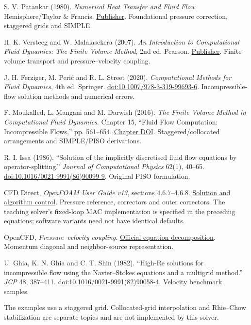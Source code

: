 \documentclass[11pt]{article}
\begin{document}
\begin{enumerate}[label={[\arabic*]}]
\item S. V. Patankar (1980). \emph{Numerical Heat Transfer and Fluid Flow}. Hemisphere/Taylor \& Francis. \href{https://www.routledge.com/Numerical-Heat-Transfer-and-Fluid-Flow/Patankar/p/book/9780891165224}{Publisher}. Foundational pressure correction, staggered grids and SIMPLE.
\item H. K. Versteeg and W. Malalasekera (2007). \emph{An Introduction to Computational Fluid Dynamics: The Finite Volume Method}, 2nd ed. Pearson. \href{https://www.pearson.com/en-gb/subject-catalog/p/Versteeg-An-Introduction-to-Computational-Fluid-Dynamics-The-Finite-Volume-Method-2nd-Edition/P200000005670?view=educator}{Publisher}. Finite-volume transport and pressure--velocity coupling.
\item J. H. Ferziger, M. Peri\'c and R. L. Street (2020). \emph{Computational Methods for Fluid Dynamics}, 4th ed. Springer. \href{https://doi.org/10.1007/978-3-319-99693-6}{doi:10.1007/978-3-319-99693-6}. Incompressible-flow solution methods and numerical errors.
\item F. Moukalled, L. Mangani and M. Darwish (2016). \emph{The Finite Volume Method in Computational Fluid Dynamics}. Chapter 15, ``Fluid Flow Computation: Incompressible Flows,'' pp. 561--654. \href{https://doi.org/10.1007/978-3-319-16874-6_15}{Chapter DOI}. Staggered/collocated arrangements and SIMPLE/PISO derivations.
\item R. I. Issa (1986). ``Solution of the implicitly discretised fluid flow equations by operator-splitting.'' \emph{Journal of Computational Physics} 62(1), 40--65. \href{https://doi.org/10.1016/0021-9991(86)90099-9}{doi:10.1016/0021-9991(86)90099-9}. Original PISO formulation.
\item CFD Direct, \emph{OpenFOAM User Guide v13}, sections 4.6.7--4.6.8. \href{https://doc.cfd.direct/openfoam/user-guide-v13/fvsolution}{Solution and algorithm control}. Pressure reference, correctors and outer correctors. The teaching solver's fixed-loop MAC implementation is specified in the preceding equations; software variants need not have identical defaults.
\item OpenCFD, \emph{Pressure--velocity coupling}. \href{https://doc.openfoam.com/2306/tools/processing/solvers/pressure-velocity/}{Official equation decomposition}. Momentum diagonal and neighbor-source representation.
\item U. Ghia, K. N. Ghia and C. T. Shin (1982). ``High-Re solutions for incompressible flow using the Navier--Stokes equations and a multigrid method.'' \emph{JCP} 48, 387--411. \href{https://doi.org/10.1016/0021-9991(82)90058-4}{doi:10.1016/0021-9991(82)90058-4}. Velocity benchmark samples.
\end{enumerate}
The examples use a staggered grid. Collocated-grid interpolation and Rhie--Chow stabilization are separate topics and are not implemented by this solver.

\end{document}
